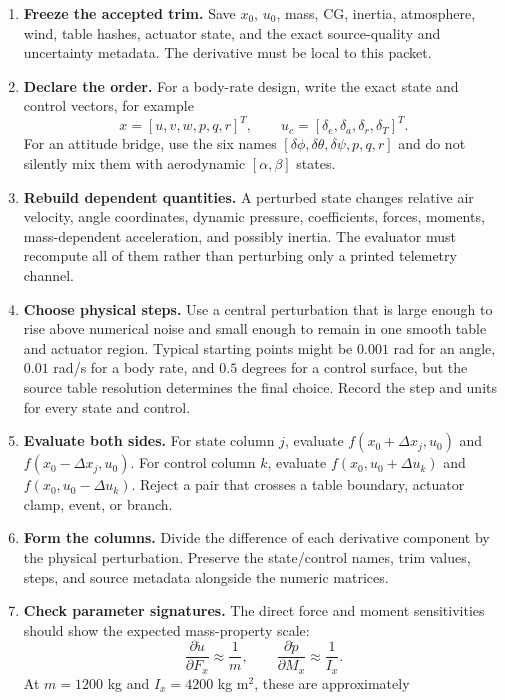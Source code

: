 \documentclass[11pt]{article}
\begin{document}
\begin{enumerate}
  \item \textbf{Freeze the accepted trim.} Save $x_0$, $u_0$, mass, CG,
    inertia, atmosphere, wind, table hashes, actuator state, and the exact
    source-quality and uncertainty metadata. The derivative must be local to
    this packet.
  \item \textbf{Declare the order.} For a body-rate design, write the exact
    state and control vectors, for example
    \[
      x=[u,v,w,p,q,r]^T,\qquad
      u_c=[\delta_e,\delta_a,\delta_r,\delta_T]^T.
    \]
    For an attitude bridge, use the six names
    $[\delta\phi,\delta\theta,\delta\psi,p,q,r]$ and do not silently mix
    them with aerodynamic $[\alpha,\beta]$ states.
  \item \textbf{Rebuild dependent quantities.} A perturbed state changes
    relative air velocity, angle coordinates, dynamic pressure, coefficients,
    forces, moments, mass-dependent acceleration, and possibly inertia. The
    evaluator must recompute all of them rather than perturbing only a printed
    telemetry channel.
  \item \textbf{Choose physical steps.} Use a central perturbation that is
    large enough to rise above numerical noise and small enough to remain in
    one smooth table and actuator region. Typical starting points might be
    $0.001$ rad for an angle, $0.01$ rad/s for a body rate, and $0.5$ degrees
    for a control surface, but the source table resolution determines the final
    choice. Record the step and units for every state and control.
  \item \textbf{Evaluate both sides.} For state column $j$, evaluate
    $f(x_0+\Delta x_j,u_0)$ and $f(x_0-\Delta x_j,u_0)$. For control column
    $k$, evaluate $f(x_0,u_0+\Delta u_k)$ and
    $f(x_0,u_0-\Delta u_k)$. Reject a pair that crosses a table boundary,
    actuator clamp, event, or branch.
  \item \textbf{Form the columns.} Divide the difference of each derivative
    component by the physical perturbation. Preserve the state/control names,
    trim values, steps, and source metadata alongside the numeric matrices.
  \item \textbf{Check parameter signatures.} The direct force and moment
    sensitivities should show the expected mass-property scale:
    \[
      \frac{\partial\dot u}{\partial F_x}\approx\frac{1}{m},\qquad
      \frac{\partial\dot p}{\partial M_x}\approx\frac{1}{I_x}.
    \]
    At $m=1200$ kg and $I_x=4200$ kg m$^2$, these are approximately

\end{enumerate}
\end{document}
